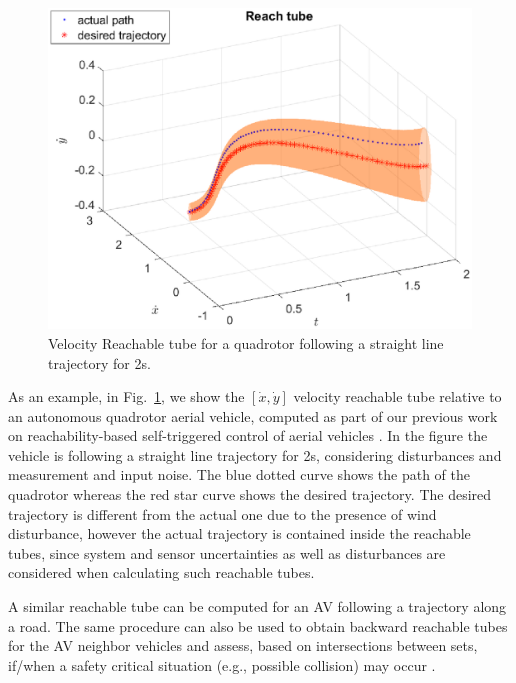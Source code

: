 \begin{figure}
\vspace{-5pt}
\centering
\includegraphics[width = \linewidth ]{fig/reach_set_vel.eps} 
\caption{Velocity Reachable tube for a quadrotor following a straight line trajectory for 2s.}
\vspace{-5pt}
\label{fig:reach_set}
\end{figure}
As an example, in Fig.~\ref{fig:reach_set}, we show the $[\dot x, \dot y]$ velocity reachable tube relative to an autonomous quadrotor aerial vehicle, computed as part of our previous work on reachability-based self-triggered control of aerial vehicles \cite{esen18ICRA, esen17AHS, esen17ISAR}. In the figure the vehicle is following a straight line trajectory for 2s, considering disturbances and measurement and input noise.
The blue dotted curve shows the path of the quadrotor whereas the red star curve shows the desired trajectory. The desired trajectory is different from the actual one due to the presence of wind disturbance, however the actual trajectory is contained inside the reachable tubes, since system and sensor uncertainties as well as disturbances are considered when calculating such reachable tubes.

A similar reachable tube can be computed for an AV following a trajectory along a road. The same procedure can also be used to obtain backward reachable tubes for the AV neighbor vehicles and assess, based on intersections between sets, if/when a safety critical situation (e.g., possible collision) may occur \cite{esen_ICRA_WS}.

